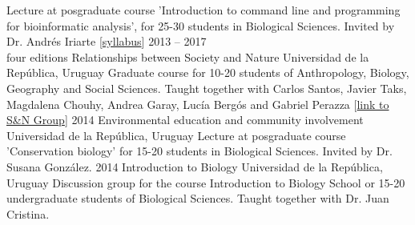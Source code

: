 \documentclass[9pt]{developercv} %
\begin{document}
\begin{entrylist}
		{Lecture at posgraduate course 'Introduction to command line and programming for bioinformatic analysis', for 25-30 students in Biological Sciences. Invited by Dr. Andr\'{e}s Iriarte [\href{https://github.com/bienflorencia/clases_python}{syllabus}]}
	\entry
		{2013 -- 2017\\\footnotesize{four editions}}
		{Relationships between Society and Nature}
		{Universidad de la Rep\'{u}blica, Uruguay}
		{Graduate course for 10-20 students of Anthropology, Biology, Geography and Social Sciences. Taught together with Carlos Santos, Javier Taks, Magdalena Chouhy, Andrea Garay, Luc\'{i}a Berg\'{o}s and Gabriel Perazza [\href{https://udelar.edu.uy/retema/actividades/grupos-de-trabajo/}{link to S\&N Group}]}
	\entry
		{2014}
		{Environmental education and community involvement}
		{Universidad de la Rep\'{u}blica, Uruguay}
		{Lecture at posgraduate course 'Conservation biology' for 15-20 students in Biological Sciences. Invited by Dr. Susana Gonz\'{a}lez. }
	\entry
		{2014}
		{Introduction to Biology}
		{Universidad de la Rep\'{u}blica, Uruguay}
		{Discussion group for the course Introduction to Biology School or 15-20 undergraduate students of Biological Sciences. Taught together with Dr. Juan Cristina.}
\end{entrylist}

\end{document}

